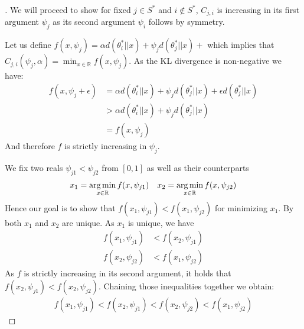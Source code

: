 \begin{proof}[]
  We will proceed to show for fixed $j \in S^*$ and $i \notin S^*$, $C_{j, i}$ is increasing in its first argument $\psi_j$ as its second argument $\psi_i$ follows by symmetry.

  Let us define $f(x, \psi_j) = \alpha d(\theta_i^*||x) + \psi_j d(\theta_j^*||x) + $ which implies that $C_{j, i}(\psi_j, \alpha) = \min_{x \in \mathbb{R}} f(x, \psi_j)$. As the KL divergence is non-negative we have:
  \begin{align}
    f(x, \psi_j + \epsilon) &= \alpha d(\theta_i^*||x) + \psi_j d(\theta_j^*||x) + \epsilon d(\theta_j^*||x) \\
    &> \alpha d(\theta_i^*||x) + \psi_j d(\theta_j^*||x)\\
    &= f(x, \psi_j)
  \end{align}
  And therefore $f$ is strictly increasing in $\psi_j$.

  We fix two reals $\psi_{j1} < \psi_{j2}$ from $[0, 1]$ as well as their counterparts
  \begin{align}
    &x_1 = \operatorname*{arg\,min}_{x \in \mathbb{R}} f(x, \psi_{j1})
    &x_2 = \operatorname*{arg\,min}_{x \in \mathbb{R}} f(x, \psi_{j2})
  \end{align}
  Hence our goal is to show that $f(x_1, \psi_{j1}) < f(x_1, \psi_{j2})$ for minimizing $x_1$. By  both $x_1$ and $x_2$ are unique. As $x_1$ is unique, we have
  \begin{align}
    f(x_1, \psi_{j1}) &< f(x_2, \psi_{j1}) \\
    f(x_2, \psi_{j2}) &< f(x_1, \psi_{j2})
  \end{align}
  As $f$ is strictly increasing in its second argument, it holds that $f(x_2, \psi_{j1}) < f(x_2, \psi_{j2})$. Chaining those inequalities together we obtain:
  \begin{align}
    f(x_1, \psi_{j1}) < f(x_2, \psi_{j1})  < f(x_2, \psi_{j2}) < f(x_1, \psi_{j2})
  \end{align}
\end{proof}

